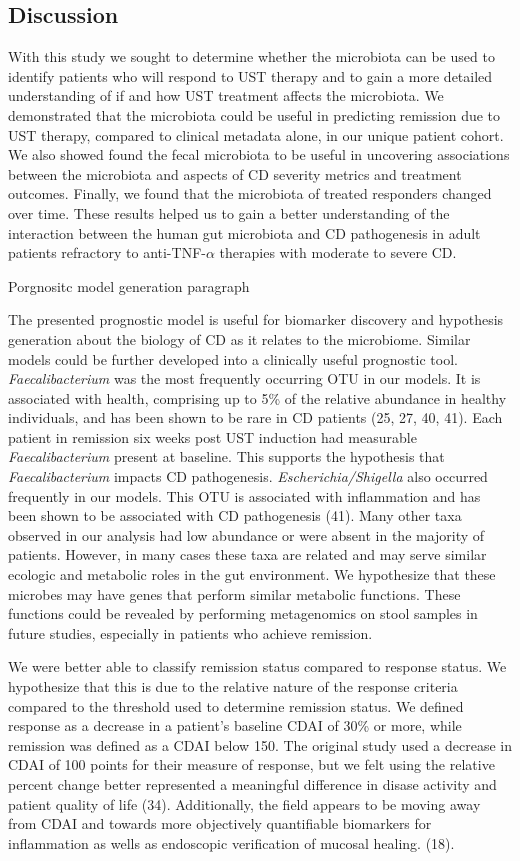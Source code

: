\documentclass[11pt,]{article}
\begin{document}
\subsection{Discussion}\label{discussion}

With this study we sought to determine whether the microbiota can be
used to identify patients who will respond to UST therapy and to gain a
more detailed understanding of if and how UST treatment affects the
microbiota. We demonstrated that the microbiota could be useful in
predicting remission due to UST therapy, compared to clinical metadata
alone, in our unique patient cohort. We also showed found the fecal
microbiota to be useful in uncovering associations between the
microbiota and aspects of CD severity metrics and treatment outcomes.
Finally, we found that the microbiota of treated responders changed over
time. These results helped us to gain a better understanding of the
interaction between the human gut microbiota and CD pathogenesis in
adult patients refractory to anti-TNF-\({\alpha}\) therapies with
moderate to severe CD.

Porgnositc model generation paragraph

The presented prognostic model is useful for biomarker discovery and
hypothesis generation about the biology of CD as it relates to the
microbiome. Similar models could be further developed into a clinically
useful prognostic tool. \emph{Faecalibacterium} was the most frequently
occurring OTU in our models. It is associated with health, comprising up
to 5\% of the relative abundance in healthy individuals, and has been
shown to be rare in CD patients (25, 27, 40, 41). Each patient in
remission six weeks post UST induction had measurable
\emph{Faecalibacterium} present at baseline. This supports the
hypothesis that \emph{Faecalibacterium} impacts CD pathogenesis.
\emph{Escherichia/Shigella} also occurred frequently in our models. This
OTU is associated with inflammation and has been shown to be associated
with CD pathogenesis (41). Many other taxa observed in our analysis had
low abundance or were absent in the majority of patients. However, in
many cases these taxa are related and may serve similar ecologic and
metabolic roles in the gut environment. We hypothesize that these
microbes may have genes that perform similar metabolic functions. These
functions could be revealed by performing metagenomics on stool samples
in future studies, especially in patients who achieve remission.

We were better able to classify remission status compared to response
status. We hypothesize that this is due to the relative nature of the
response criteria compared to the threshold used to determine remission
status. We defined response as a decrease in a patient's baseline CDAI
of 30\% or more, while remission was defined as a CDAI below 150. The
original study used a decrease in CDAI of 100 points for their measure
of response, but we felt using the relative percent change better
represented a meaningful difference in disase activity and patient
quality of life (34). Additionally, the field appears to be moving away
from CDAI and towards more objectively quantifiable biomarkers for
inflammation as wells as endoscopic verification of mucosal healing.
(18).
\end{document}
